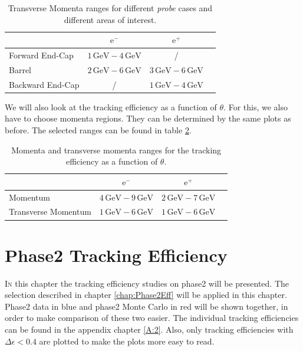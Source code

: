 \documentclass[a4paper,11pt,twosided,final,german,openbib,pdftex,listof=totoc,bibliography=totoc]{scrbook}
\begin{document}
\begin{table}[h!]
	\centering
	\begin{tabular}{lccc}
		&$\textrm{e}^-$ &$\textrm{e}^+$\\
		\hline
		Forward End-Cap &$1\,\textrm{GeV} - 4\,\textrm{GeV}$&/\\
		Barrel &$2\,\textrm{GeV} - 6\,\textrm{GeV}$&$3\,\textrm{GeV} - 6\,\textrm{GeV}$\\
		Backward End-Cap & /&$1\,\textrm{GeV} - 4\,\textrm{GeV}$\\
	\end{tabular}
	
	\caption[Areas Of Interest Different Transverse Momenta Ranges]{Transverse Momenta ranges for different \textit{probe} cases and different areas of interest.}
	\label{tab:RTPtMDTable}
\end{table}








We will also look at the tracking efficiency as a function of $\theta$. For this, we also have to choose momenta regions. They can be determined by the same plots as before.
The selected ranges can be found in table \ref{tab:RTPMDThetaTable}.

\begin{table}[h!]
	\centering
	\begin{tabular}{lccc}
		&$\textrm{e}^-$ &$\textrm{e}^+$\\
		\hline
		Momentum &$4\,\textrm{GeV} - 9\,\textrm{GeV}$&$2\,\textrm{GeV} - 7\,\textrm{GeV}$\\
		Transverse Momentum &$1\,\textrm{GeV} - 6\,\textrm{GeV}$&$1\,\textrm{GeV} - 6\,\textrm{GeV}$\\

	\end{tabular}
	
	\caption[Different (Transverse-) Momenta Ranges For $\theta$ Efficiency]{Momenta and transverse momenta ranges for the tracking efficiency as a function of $\theta$.}
	\label{tab:RTPMDThetaTable}
\end{table}




\chapter{Phase2 Tracking Efficiency}
\label{chp:TrackingEfficiencyPhase2}



\lettrine{I}{n} this chapter the tracking efficiency studies on phase2 will be presented. The selection described in chapter \ref{chap:Phase2Eff} will be applied in this chapter. Phase2 data in blue and phase2 Monte Carlo in red will be shown together, in order to make comparison of these two easier. The individual tracking efficiencies can be found in the appendix chapter \ref{A:2}. Also, only tracking efficiencies with $\Delta \epsilon < 0.4$ are plotted to make the plots more easy to read. 
\newline
 
\end{document}
